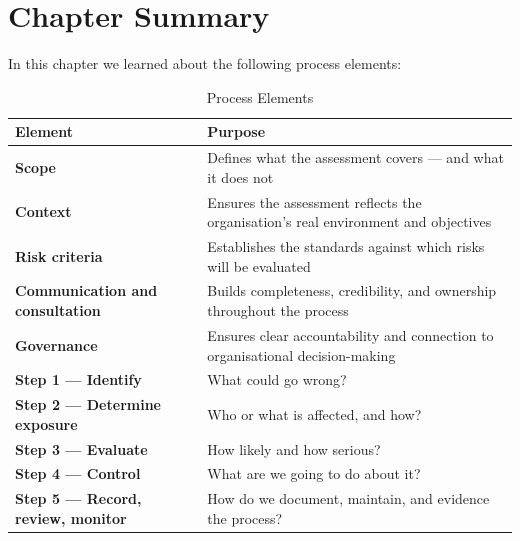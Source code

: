 \section{Chapter Summary}
In this chapter we learned about the following process elements:
\begin{table}[H]
  \centering
  \renewcommand{\arraystretch}{1.5}
  \begin{tabularx}{\textwidth}{ | >{\raggedright\arraybackslash}p{} 
                                | >{\raggedright\arraybackslash}X | }
    \hline
    \textbf{Element} & \textbf{Purpose} \\
    \hline
    \textbf{Scope} & Defines what the assessment covers — and what it does not\\
    \hline
    \textbf{Context} & Ensures the assessment reflects the organisation's real environment and objectives\\
    \hline
    \textbf{Risk criteria} & Establishes the standards against which risks will be evaluated\\
    \hline
    \textbf{Communication and consultation} & Builds completeness, credibility, and ownership throughout the process\\
    \hline
    \textbf{Governance} & Ensures clear accountability and connection to organisational decision-making\\
    \hline
    \textbf{Step 1 — Identify} & What could go wrong?\\
    \hline
    \textbf{Step 2 — Determine exposure} & Who or what is affected, and how?\\
    \hline
    \textbf{Step 3 — Evaluate} & How likely and how serious?\\
    \hline
    \textbf{Step 4 — Control} & What are we going to do about it?\\
    \hline
    \textbf{Step 5 — Record, review, monitor} & How do we document, maintain, and evidence the process?\\
    \hline
  \end{tabularx}
  \caption{Process Elements}
\end{table}

